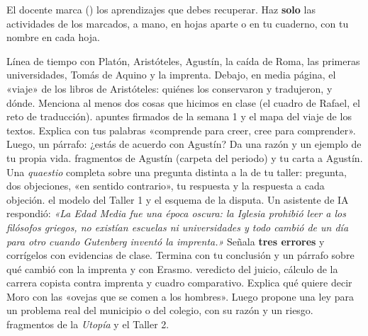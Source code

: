 \documentclass[habilitacion]{planeacion}
\begin{document}
\fichahabilitacion


El docente marca (\casilla) los aprendizajes que debes recuperar. Haz \textbf{solo} las actividades
de los marcados, a mano, en hojas aparte o en tu cuaderno, con tu nombre en cada hoja.

\begin{recuperacion}
  {Línea de tiempo con Platón, Aristóteles, Agustín, la caída de Roma, las primeras universidades,
  Tomás de Aquino y la imprenta. Debajo, en media página, el «viaje» de los libros de Aristóteles:
  quiénes los conservaron y tradujeron, y dónde. Menciona al menos dos cosas que hicimos en clase
  (el cuadro de Rafael, el reto de traducción).}
  {apuntes firmados de la semana 1 y el mapa del viaje de los textos.}
  {Explica con tus palabras «comprende para creer, cree para comprender». Luego, un párrafo: ¿estás
  de acuerdo con Agustín? Da una razón y un ejemplo de tu propia vida.}
  {fragmentos de Agustín (carpeta del periodo) y tu carta a Agustín.}
  {Una \emph{quaestio} completa sobre una pregunta distinta a la de tu taller: pregunta, dos
  objeciones, «en sentido contrario», tu respuesta y la respuesta a cada objeción.}
  {el modelo del Taller 1 y el esquema de la disputa.}
  {Un asistente de IA respondió: \textit{«La Edad Media fue una época oscura: la Iglesia prohibió
  leer a los filósofos griegos, no existían escuelas ni universidades y todo cambió de un día para
  otro cuando Gutenberg inventó la imprenta.»} Señala \textbf{tres errores} y corrígelos con
  evidencias de clase. Termina con tu conclusión y un párrafo sobre qué cambió con la imprenta y
  con Erasmo.}
  {veredicto del juicio, cálculo de la carrera copista contra imprenta y cuadro comparativo.}
  {Explica qué quiere decir Moro con las «ovejas que se comen a los hombres». Luego propone una ley
  para un problema real del municipio o del colegio, con su razón y un riesgo.}
  {fragmentos de la \emph{Utopía} y el Taller 2.}
\end{recuperacion}
\end{document}
